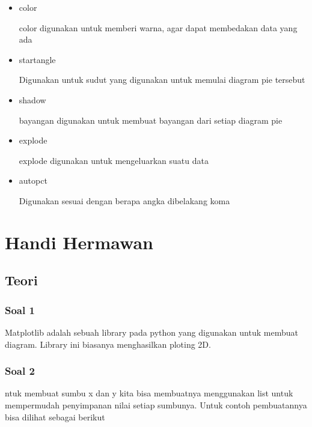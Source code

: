 \begin{enumerate}
\begin{itemize}
    \item color

    color digunakan untuk memberi warna, agar dapat membedakan data yang ada

    \item startangle

    Digunakan untuk sudut yang digunakan untuk memulai diagram pie tersebut

    \item shadow

    bayangan digunakan untuk membuat bayangan dari setiap diagram pie 

    \item explode

    explode digunakan untuk mengeluarkan suatu data 

    \item autopct

    Digunakan sesuai dengan berapa angka dibelakang koma 

\end{itemize} 
\end{enumerate}



\section{Handi Hermawan}
\subsection{Teori}
\subsubsection{Soal 1}
\hfill \break
Matplotlib adalah sebuah library pada python yang digunakan untuk membuat diagram. Library ini biasanya menghasilkan ploting 2D.
\subsubsection{Soal 2}
\hfill \break
ntuk membuat sumbu x dan y kita bisa membuatnya menggunakan list untuk mempermudah penyimpanan nilai setiap sumbunya.
Untuk contoh pembuatannya bisa dilihat sebagai berikut

